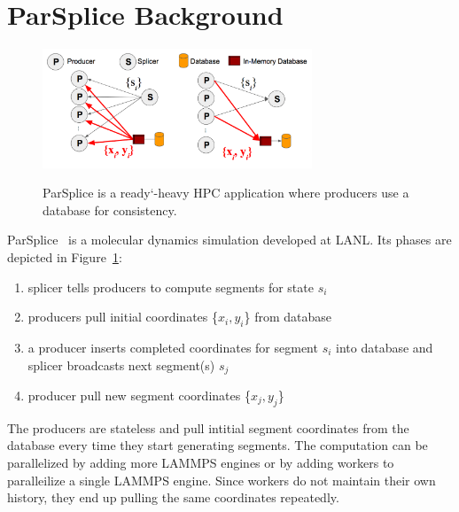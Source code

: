 \section{ParSplice Background}

\label{sec:parsplice}

\begin{figure}[t]
  \noindent\includegraphics[width=19pc,angle=0]{figures/arch-parsplice.png}\\
  \caption{ParSplice is a ready`-heavy HPC application where producers use a
  database for consistency. \label{fig:arch-parsplice}}
\end{figure}


ParSplice~\cite{perez:jctc20150parsplice} is a molecular dynamics simulation
developed at LANL. Its phases are depicted in Figure~\ref{fig:arch-parsplice}:

\begin{enumerate}

  \item splicer tells producers to compute segments for state \(s_i\)

  \item producers pull initial coordinates \{\(x_i, y_i\)\} from database

  \item a producer inserts completed coordinates for segment \(s_i\) into database and
  splicer broadcasts next segment(s) \(s_j\) 

  \item producer pull new segment coordinates \{\(x_j, y_j\)\}

\end{enumerate}

The producers are stateless and pull intitial segment coordinates from the
database every time they start generating segments. The computation can be
parallelized by adding more LAMMPS engines or by adding workers to paralleilize
a single LAMMPS engine.  Since workers do not maintain their own history, they
end up pulling the same coordinates repeatedly.

